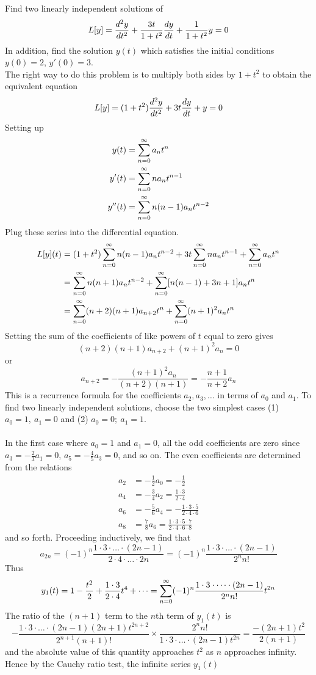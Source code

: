 \documentclass[12pt]{article}
\begin{document}
\begin{example} Find two linearly independent solutions of $$L[y] = \frac{d^2y}{dt^2} + \frac{3t}{1 + t^2}\frac{dy}{dt} + \frac{1}{1 + t^2}y = 0 $$ In addition, find the solution $y(t)$ which satisfies the initial conditions $y(0) = 2$, $y'(0) = 3$. \\
The right way to do this problem is to multiply both sides by $1 + t^2$ to obtain the equivalent equation $$L[y] = (1 + t^2)\frac{d^2y}{dt^2} + 3t\frac{dy}{dt} + y = 0 $$ Setting up $$\begin{aligned} y(t) &= \sum_{n = 0}^{\infty} a_nt^n \\ y'(t) &= \sum_{n = 0}^{\infty} na_nt^{n - 1} \\ y''(t) &= \sum_{n = 0}^{\infty} n(n - 1)a_nt^{n - 2} \end{aligned} $$ Plug these series into the differential equation. $$\begin{aligned} L[y](t) &= (1 + t^2)\sum_{n = 0}^{\infty} n(n - 1)a_nt^{n - 2} + 3t \sum_{n = 0}^{\infty} na_nt^{n - 1} + \sum_{n = 0}^{\infty} a_nt^n \\ &= \sum_{n = 0}^{\infty} n(n + 1)a_nt^{n - 2} + \sum_{n = 0}^{\infty} [n(n - 1) + 3n + 1]a_nt^n \\ &= \sum_{n = 0}^{\infty} (n + 2)(n + 1)a_{n + 2}t^n + \sum_{n = 0}^{\infty} (n + 1)^2a_nt^n \end{aligned} $$ Setting the sum of the coefficients of like powers of $t$ equal to zero gives $$(n + 2)(n + 1)a_{n + 2} + (n + 1)^2a_n = 0 $$ or $$a_{n + 2} = -\frac{(n + 1)^2a_n}{(n + 2)(n + 1)} = -\frac{n + 1}{n + 2}a_n $$ This is a recurrence formula for the coefficients $a_2, a_3, \dots$ in terms of $a_0$ and $a_1$. To find two linearly independent solutions, choose the two simplest cases (1) $a_0 = 1,~ a_1 = 0$ and (2) $a_0 = 0;~ a_1 = 1$. \\~\\ In the first case where $a_0 = 1$ and $a_1 = 0$, all the odd coefficients are zero since $a_3 = -\frac{2}{3}a_1 = 0$, $a_5 = -\frac{4}{5}a_3 = 0$, and so on. The even coefficients are determined from the relations $$\begin{aligned} a_2 &= -\frac{1}{2}a_0 = -\frac{1}{2} \\ a_4 &= -\frac{3}{4}a_2 = \frac{1 \cdot 3}{2 \cdot 4} \\ a_6 &= -\frac{5}{6}a_4 = -\frac{1 \cdot 3 \cdot 5}{2 \cdot 4 \cdot 6} \\ a_8 &= \frac{7}{8}a_6 = \frac{1 \cdot 3 \cdot 5 \cdot 7}{2 \cdot 4 \cdot 6 \cdot 8} \end{aligned} $$ and so forth. Proceeding inductively, we find that $$a_{2n} = (-1)^n \frac{1 \cdot 3 \cdot \dots \cdot (2n -1)}{2 \cdot 4 \cdot \dots \cdot 2n} = (-1)^n \frac{1 \cdot 3 \cdot \dots \cdot (2n - 1)}{2^nn!} $$ Thus $$y_1(t) = 1 - \frac{t^2}{2} + \frac{1 \cdot 3}{2 \cdot 4}t^4 + \dots = \sum_{n = 0}^{\infty} (-1)^n\frac{1 \cdot 3 \cdot \dots \cdot (2n - 1)}{2^nn!}t^{2n} $$ The ratio of the $(n + 1)$ term to the $n$th term of $y_1(t)$ is $$-\frac{1 \cdot 3 \cdot \dots \cdot (2n - 1)(2n + 1)t^{2n + 2}}{2^{n + 1}(n + 1)!} \times \frac{2^nn!}{1 \cdot 3 \cdot \dots \cdot (2n - 1)t^{2n}} = \frac{-(2n + 1)t^2}{2(n + 1)} $$ and the absolute value of this quantity approaches $t^2$ as $n$ approaches infinity. Hence by the Cauchy ratio test, the infinite series $y_1(t)$ 
\end{example}
\end{document}
